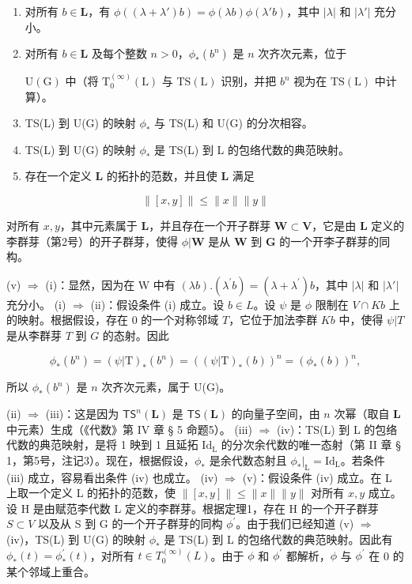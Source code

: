 \begin{enumerate}
\def\labelenumi{(\roman{enumi})}
\item
  对所有 \(b \in \mathbf{L}\)，有 \(\phi((\lambda + \lambda')b) = \phi(\lambda b)\phi(\lambda'b)\)，其中 \(|\lambda|\) 和 \(|\lambda'|\) 充分小。
\item
  对所有 \(b \in \mathbf{L}\) 及每个整数 \(n > 0\)，\(\phi_{*}(b^{n})\) 是 \(n\) 次齐次元素，位于

\(\mathrm{U}(\mathrm{G})\) 中（将 \(\mathrm{T}_{0}^{(\infty)}(\mathrm{L})\) 与 \(\mathrm{TS}(\mathrm{L})\) 识别，并把 \(b^{n}\) 视为在 \(\mathrm{TS}(\mathrm{L})\) 中计算）。

\item
  TS(L) 到 U(G) 的映射 \(\phi_{*}\) 与 TS(L) 和 U(G) 的分次相容。
\item
  TS(L) 到 U(G) 的映射 \(\phi_*\) 是 TS(L) 到 L 的包络代数的典范映射。
\item
  存在一个定义 \(\mathbf{L}\) 的拓扑的范数，并且使 \(\mathbf{L}\) 满足
\end{enumerate}

\[
\| [ x, y ] \| \leqslant \| x \| \| y \|
\]

对所有 \(x, y\)，其中元素属于 \(\mathbf{L}\)，并且存在一个开子群芽 \(\mathbf{W} \subset \mathbf{V}\)，它是由 \(\mathbf{L}\) 定义的李群芽（第2号）的开子群芽，使得 \(\phi | \mathbf{W}\) 是从 \(\mathbf{W}\) 到 \(\mathbf{G}\) 的一个开李子群芽的同构。

(v) \(\Rightarrow\) (i)：显然，因为在 W 中有 \((\lambda b).(\lambda^{\prime}b) = (\lambda +\lambda^{\prime})b\)，其中 \(|\lambda |\) 和 \(|\lambda '|\) 充分小。
(i) \(\Rightarrow\) (ii)：假设条件 (i) 成立。设 \(b \in L\)。设 \(\psi\) 是 \(\phi\) 限制在 \(V \cap Kb\) 上的映射。根据假设，存在 0 的一个对称邻域 \(T\)，它位于加法李群 \(Kb\) 中，使得 \(\psi|T\) 是从李群芽 \(T\) 到 \(G\) 的态射。因此

\[
\phi_ {*} (b ^ {n}) = (\psi | \mathrm{T}) _ {*} (b ^ {n}) = ((\psi | \mathrm{T}) _ {*} (b)) ^ {n} = (\phi_ {*} (b)) ^ {n},
\]

所以 \(\phi_{*}(b^{n})\) 是 \(n\) 次齐次元素，属于 U(G)。

(ii) \(\Rightarrow\) (iii)：这是因为 \(\mathsf{TS}^n (\mathbf{L})\) 是 \(\mathsf{TS}(\mathbf{L})\) 的向量子空间，由 \(n\) 次幂（取自 \(\mathbf{L}\) 中元素）生成（《代数》第 IV 章 § 5 命题5）。
(iii) \(\Rightarrow\) (iv)：TS(L) 到 L 的包络代数的典范映射，是将 1 映到 1 且延拓 \(\mathrm{Id}_{\mathrm{L}}\) 的分次余代数的唯一态射（第 II 章 § 1，第5号，注记3）。现在，根据假设，\(\phi_{*}\) 是余代数态射且 \(\phi_{*}|_{\mathrm{L}} = \mathrm{Id}_{\mathrm{L}}\)。若条件 (iii) 成立，容易看出条件 (iv) 也成立。
(iv) \(\Rightarrow\) (v)：假设条件 (iv) 成立。在 L 上取一个定义 L 的拓扑的范数，使 \(\| [x,y]\| \leqslant \| x\| \| y\|\) 对所有 \(x,y\) 成立。设 H 是由赋范李代数 L 定义的李群芽。根据定理1，存在 H 的一个开子群芽 \(S\subset V\) 以及从 S 到 G 的一个开子群芽的同构 \(\phi^{\prime}\)。由于我们已经知道 (v) \(\Rightarrow\) (iv)，TS(L) 到 U(G) 的映射 \(\phi_{*}\) 是 TS(L) 到 L 的包络代数的典范映射。因此有 \(\phi_{*}(t) = \phi_{*}^{\prime}(t)\)，对所有 \(t\in T_0^{(\infty)}(L)\)。由于 \(\phi\) 和 \(\phi^{\prime}\) 都解析，\(\phi\) 与 \(\phi^{\prime}\) 在 0 的某个邻域上重合。

